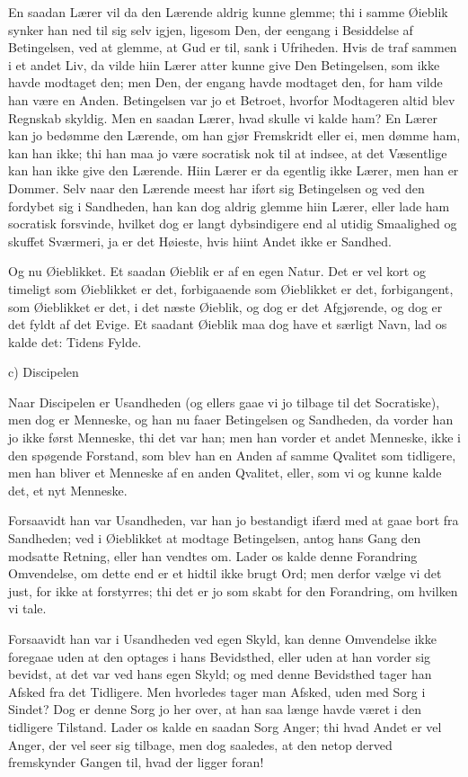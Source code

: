 \documentclass[12pt,a4paper]{article}
\begin{document}
En saadan Lærer vil da den Lærende aldrig kunne glemme; thi i samme Øieblik synker han ned til sig selv igjen, ligesom Den, der eengang i Besiddelse af Betingelsen, ved at glemme, at Gud er til, sank i Ufriheden. Hvis de traf sammen i et andet Liv, da vilde hiin Lærer atter kunne give Den Betingelsen, som ikke havde modtaget den; men Den, der engang havde modtaget den, for ham vilde han være en Anden. Betingelsen var jo et Betroet, hvorfor Modtageren altid blev Regnskab skyldig. Men en saadan Lærer, hvad skulle vi kalde ham? En Lærer kan jo bedømme den Lærende, om han gjør Fremskridt eller ei, men dømme ham, kan han ikke; thi han maa jo være socratisk nok til at indsee, at det Væsentlige kan han ikke give den Lærende. Hiin Lærer er da egentlig ikke Lærer, men han er Dommer. Selv naar den Lærende meest har iført sig Betingelsen og ved den fordybet sig i Sandheden, han kan dog aldrig glemme hiin Lærer, eller lade ham socratisk forsvinde, hvilket dog er langt dybsindigere end al utidig Smaalighed og skuffet Sværmeri, ja er det Høieste, hvis hiint Andet ikke er Sandhed.

Og nu Øieblikket. Et saadan Øieblik er af en egen Natur. Det er vel kort og timeligt som Øieblikket er det, forbigaaende som Øieblikket er det, forbigangent, som Øieblikket er det, i det næste Øieblik, og dog er det Afgjørende, og dog er det fyldt af det Evige. Et saadant Øieblik maa dog have et særligt Navn, lad os kalde det: Tidens Fylde.

c) Discipelen

Naar Discipelen er Usandheden (og ellers gaae vi jo tilbage til det Socratiske), men dog er Menneske, og han nu faaer Betingelsen og Sandheden, da vorder han jo ikke først Menneske, thi det var han; men han vorder et andet Menneske, ikke i den spøgende Forstand, som blev han en Anden af samme Qvalitet som tidligere, men han bliver et Menneske af en anden Qvalitet, eller, som vi og kunne kalde det, et nyt Menneske.

Forsaavidt han var Usandheden, var han jo bestandigt ifærd med at gaae bort fra Sandheden; ved i Øieblikket at modtage Betingelsen, antog hans Gang den modsatte Retning, eller han vendtes om. Lader os kalde denne Forandring Omvendelse, om dette end er et hidtil ikke brugt Ord; men derfor vælge vi det just, for ikke at forstyrres; thi det er jo som skabt for den Forandring, om hvilken vi tale.

Forsaavidt han var i Usandheden ved egen Skyld, kan denne Omvendelse ikke foregaae uden at den optages i hans Bevidsthed, eller uden at han vorder sig bevidst, at det var ved hans egen Skyld; og med denne Bevidsthed tager han Afsked fra det Tidligere. Men hvorledes tager man Afsked, uden med Sorg i Sindet? Dog er denne Sorg jo her over, at han saa længe havde været i den tidligere Tilstand. Lader os kalde en saadan Sorg Anger; thi hvad Andet er vel Anger, der vel seer sig tilbage, men dog saaledes, at den netop derved fremskynder Gangen til, hvad der ligger foran!
\end{document}
